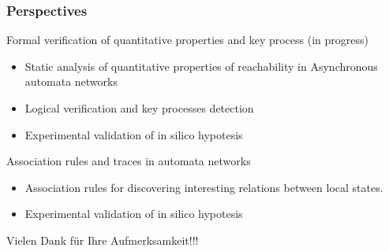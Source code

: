 \begin{frame}
 \frametitle{Perspectives}
 
 \begin{block}{Formal verification of quantitative properties and key process (in progress)}
  \begin{itemize}
   \item Static analysis of quantitative properties of reachability in Asynchronous automata networks
   \item Logical verification and key processes detection
   \item Experimental validation of in silico hypotesis
  \end{itemize}

 \end{block}
 
 \begin{block}{Association rules and traces in automata networks}
  \begin{itemize}
   \item Association rules for discovering interesting relations between local states. 
   \item Experimental validation of in silico hypotesis
  \end{itemize}

 \end{block}
 
\end{frame}

\begin{frame}
Vielen Dank für Ihre Aufmerksamkeit!!!
\end{frame}
